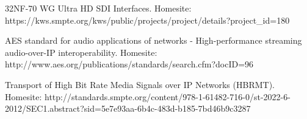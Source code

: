 \documentclass[english,final]{setup/eetac_tfc_pfc}
\begin{document}
32NF-70 WG Ultra HD SDI Interfaces. Homesite: https://kws.smpte.org/kws/public/projects/project/details?project_id=180

AES standard for audio applications of networks - High-performance streaming audio-over-IP interoperability. Homesite: http://www.aes.org/publications/standards/search.cfm?docID=96

Transport of High Bit Rate Media Signals over IP Networks (HBRMT). Homesite: http://standards.smpte.org/content/978-1-61482-716-0/st-2022-6-2012/SEC1.abstract?sid=5e7e93aa-6b4c-483d-b185-7bd46b9c3287

\pagestyle{empty}  %

\appendix\senseportada









\end{document}
